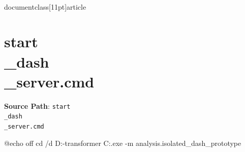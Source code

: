 \\documentclass[11pt]{article}
\begin{document}
\section*{start\\_dash\\_server.cmd}
\textbf{Source Path}: \texttt{start\\_dash\\_server.cmd}\par
\bigskip
\begin{CodeBlock}
@echo off
cd /d D:\belief-transformer
C:\Users\Andrew{}\pythonw.exe -m analysis.isolated_dash_prototype


\end{CodeBlock}
\end{document}
